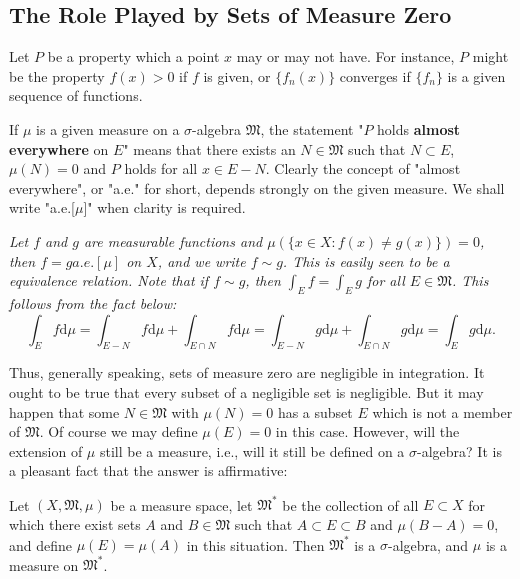 \subsection{The Role Played by Sets of Measure Zero}
Let $P$ be a property which a point $x$ may or may not have. For instance, $P$ might be the property $f(x)>0$ if $f$ is given, or $\{f_n(x)\}$ converges if $\{f_n\}$ is a given sequence of functions.\par
If $\mu$ is a given measure on a $\sigma$-algebra $\mathfrak{M}$, the statement "$P$ holds \textbf{almost everywhere} on $E$" means that there exists an $N\in\mathfrak{M}$ such that $N\subset E$, $\mu(N)=0$ and $P$ holds for all $x\in E-N$. Clearly the concept of "almost everywhere", or "a.e." for short, depends strongly on the given measure. We shall write "a.e.[$\mu$]" when clarity is required.
\begin{example}\em
Let $f$ and $g$ are measurable functions and $\mu(\{x\in X:f(x)\ne g(x)\})=0$, then $f=g a.e.[\mu]$ on $X$, and we write $f\sim g$. This is easily seen to be a equivalence relation. Note that if $f\sim g$, then $\int_Ef=\int_Eg$ for all $E\in\mathfrak{M}$. This follows from the fact below:
$$
\int_E{f\mathrm{d}\mu}=\int_{E-N}{f\mathrm{d}\mu}+\int_{E\cap N}{f\mathrm{d}\mu}=\int_{E-N}{g\mathrm{d}\mu}+\int_{E\cap N}{g\mathrm{d}\mu}=\int_E{g\mathrm{d}\mu}.
$$
\end{example}
Thus, generally speaking, sets of measure zero are negligible in integration. It ought to be true that every subset of a negligible set is negligible. But it may happen that some $N\in\mathfrak{M}$ with $\mu(N)=0$ has a subset $E$ which is not a member of $\mathfrak{M}$. Of course we may define $\mu(E)=0$ in this case. However, will the extension of $\mu$ still be a measure, i.e., will it still be defined on a $\sigma$-algebra? It is a pleasant fact that the answer is affirmative:
\begin{theorem}
Let $(X,\mathfrak{M},\mu)$ be a measure space, let $\mathfrak{M}^*$ be the collection of all $E\subset X$ for which there exist sets $A$ and $B\in\mathfrak{M}$ such that $A\subset E\subset B$ and $\mu(B-A)=0$, and define $\mu(E)=\mu(A)$ in this situation. Then $\mathfrak{M}^*$ is a $\sigma$-algebra, and $\mu$ is a measure on $\mathfrak{M}^*$.
\end{theorem}

